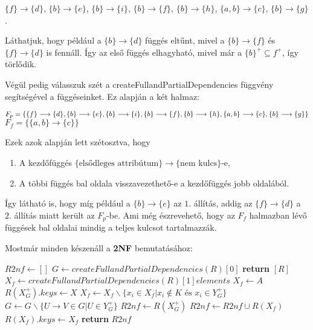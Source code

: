 \begin{pld}
\begin{center}
    $\{f\} \longrightarrow \{d\}$, 
    $\{b\} \longrightarrow \{e\}$, 
    $\{b\} \longrightarrow \{i\}$,
    $\{b\} \longrightarrow \{f\}$, \break 
    $\{b\} \longrightarrow \{h\}$, 
    $\{a,b\} \longrightarrow \{c\}$, 
    $\{b\} \longrightarrow \{g\}$.
\end{center}

Láthatjuk, hogy például a $\{b\} \longrightarrow \{d\}$ függés eltűnt, mivel a  $\{b\} \longrightarrow \{f\}$ és $\{f\} \longrightarrow \{d\}$ is fennáll. Így az első függés elhagyható, mivel már a $\{b\}^+ \subseteq {f}^+$, így törlődik. 

Végül pedig válasszuk szét a createFullandPartialDependencies függvény segítségével a függéseinket. Ez alapján a két halmaz:

\begin{center}
    $F_p = \{ \{f\} \longrightarrow \{d\}, 
    \{b\} \longrightarrow \{e\}, 
    \{b\} \longrightarrow \{i\},
    \{b\} \longrightarrow \{f\}, \break
    \{b\} \longrightarrow \{h\}, 
    \{a,b\} \longrightarrow \{c\}, 
    \{b\} \longrightarrow \{g\} \}$ \break
    $F_f = \{\{a,b\} \longrightarrow \{c\} \}$
\end{center}

Ezek azok alapján lett szétosztva, hogy
\begin{enumerate}
    \item A kezdőfüggés $\{ \text{elsődleges attribútum} \} \longrightarrow \{ \text{nem kulcs}\}$-e,
    \item A többi függés bal oldala visszavezethető-e a kezdőfüggés jobb oldalából.
\end{enumerate}

Így látható is, hogy míg például a $\{b\} \longrightarrow \{e\}$ az $1.$ állítás, addig az $\{f\} \longrightarrow \{d\}$ a $2.$ állítás miatt került az $F_p$-be. Ami még észrevehető, hogy az $F_f$ halmazban lévő függések bal oldalai mindig a teljes kulcsot tartalmazzák.
\end{pld}

Mostmár minden készenáll a \textbf{2NF} bemutatásához:

\begin{algorithmic}
        \State $R2nf \gets []$
        \State $G \gets createFullandPartialDependencies(R)[0]$
            \State \textbf{return} $[R]$
        \EndIf
            \State $X_f \gets createFullandPartialDependencies(R)[1] elements$
        \Else
            \State $X_f \gets A$
        \EndIf
                \State $R(X^+_G).keys \gets X$
                \State $X_f \gets X_f \backslash \{x_i \in X_f \big | x_i \not \in K \text{ és } x_i \in Y_G^+ \}$
                \State $G \gets G \backslash \{ U \rightarrow V \in G \big | U \in Y_G^+ \}$
                \State $R2nf \gets R(X^+_G)$
            \EndIf
        \EndFor
        \State $R2nf \gets R2nf \cup R(X_f)$
        \State $R(X_f).keys \gets X_f$
        \State \textbf{return} $R2nf$
    \EndFunction
\end{algorithmic}

